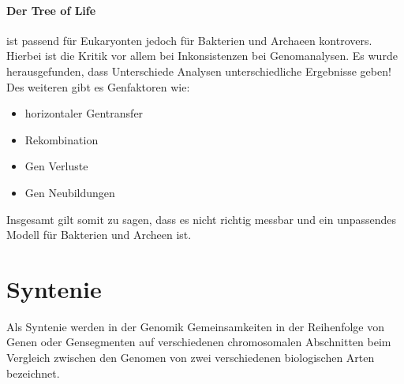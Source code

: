 \paragraph{Der Tree of Life}  ist passend für Eukaryonten jedoch für Bakterien und Archaeen kontrovers. Hierbei ist die Kritik vor allem bei Inkonsistenzen bei Genomanalysen. Es wurde herausgefunden, dass Unterschiede Analysen unterschiedliche Ergebnisse geben!\\
Des weiteren gibt es Genfaktoren wie:
\begin{itemize}
    \item horizontaler Gentransfer
    \item Rekombination
    \item Gen Verluste
    \item Gen Neubildungen
\end{itemize}
Insgesamt gilt somit zu sagen, dass es nicht richtig messbar und ein unpassendes Modell für Bakterien und Archeen ist.
\section{Syntenie} 
\begin{mechanism}[title=Definition Syntenie]
Als Syntenie werden in
der Genomik Gemeinsamkeiten in der Reihenfolge von Genen oder Gensegmenten auf verschiedenen
chromosomalen Abschnitten beim Vergleich zwischen den Genomen von zwei verschiedenen biologischen Arten
bezeichnet.
\end{mechanism} 